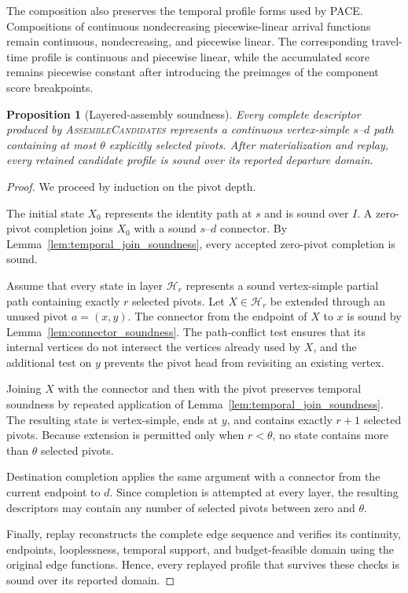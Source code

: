 \documentclass[a4paper,fleqn]{cas-dc}
\newtheorem{proposition}{Proposition}
\begin{document}
The composition also preserves the temporal profile forms used by PACE.
Compositions of continuous nondecreasing piecewise-linear arrival functions
remain continuous, nondecreasing, and piecewise linear. The corresponding
travel-time profile is continuous and piecewise linear, while the accumulated
score remains piecewise constant after introducing the preimages of the
component score breakpoints.

\begin{proposition}[Layered-assembly soundness]
\label{prop:assembly_soundness}
Every complete descriptor produced by
\textsc{AssembleCandidates} represents a continuous vertex-simple
\(s\)--\(d\) path containing at most \(\theta\) explicitly selected pivots.
After materialization and replay, every retained candidate profile is sound
over its reported departure domain.
\end{proposition}

\begin{proof}
We proceed by induction on the pivot depth.

The initial state \(X_0\) represents the identity path at \(s\) and is sound
over \(I\). A zero-pivot completion joins \(X_0\) with a sound
\(s\)--\(d\) connector. By
Lemma~\ref{lem:temporal_join_soundness}, every accepted zero-pivot completion
is sound.

Assume that every state in layer \(\mathcal H_r\) represents a sound
vertex-simple partial path containing exactly \(r\) selected pivots. Let
\(X\in\mathcal H_r\) be extended through an unused pivot \(a=(x,y)\). The
connector from the endpoint of \(X\) to \(x\) is sound by
Lemma~\ref{lem:connector_soundness}. The path-conflict test ensures that its
internal vertices do not intersect the vertices already used by \(X\), and
the additional test on \(y\) prevents the pivot head from revisiting an
existing vertex.

Joining \(X\) with the connector and then with the pivot preserves temporal
soundness by repeated application of
Lemma~\ref{lem:temporal_join_soundness}. The resulting state is
vertex-simple, ends at \(y\), and contains exactly \(r+1\) selected pivots.
Because extension is permitted only when \(r<\theta\), no state contains more
than \(\theta\) selected pivots.

Destination completion applies the same argument with a connector from the
current endpoint to \(d\). Since completion is attempted at every layer, the
resulting descriptors may contain any number of selected pivots between zero
and \(\theta\).

Finally, replay reconstructs the complete edge sequence and verifies its
continuity, endpoints, looplessness, temporal support, and budget-feasible
domain using the original edge functions. Hence, every replayed profile that
survives these checks is sound over its reported domain.
\end{proof}
\end{document}
